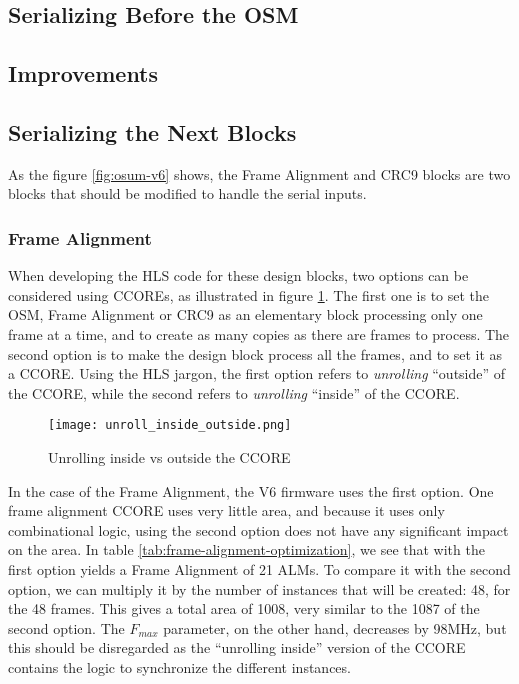 \subsection{Serializing Before the OSM}

\subsection{Improvements}


\subsection{Serializing the Next Blocks}
As the figure \ref{fig:osum-v6} shows, the Frame Alignment and CRC9 blocks are two blocks that should be modified to handle the serial inputs.

\subsubsection{Frame Alignment}

When developing the HLS code for these design blocks, two options can be considered using CCOREs, as illustrated in figure \ref{fig:unrolling-inside-outside}. The first one is to set the OSM, Frame Alignment or CRC9 as an elementary block processing only one frame at a time, and to create as many copies as there are frames to process. The second option is to make the design block process all the frames, and to set it as a CCORE. Using the HLS jargon, the first option refers to \textit{unrolling} ``outside'' of the CCORE, while the second refers to \textit{unrolling} ``inside'' of the CCORE.

\begin{figure}
    \centering
    \texttt{[image: unroll\_inside\_outside.png]}
    \caption{Unrolling inside vs outside the CCORE}
    \label{fig:unrolling-inside-outside}
\end{figure}

In the case of the Frame Alignment, the V6 firmware uses the first option. One frame alignment CCORE uses very little area, and because it uses only combinational logic, using the second option does not have any significant impact on the area. In table \ref{tab:frame-alignment-optimization}, we see that with the first option yields a Frame Alignment of 21 ALMs. To compare it with the second option, we can multiply it by the number of instances that will be created: 48, for the 48 frames. This gives a total area of 1008, very similar to the 1087 of the second option. The \(F_{max}\) parameter, on the other hand, decreases by 98MHz, but this should be disregarded as the ``unrolling inside'' version of the CCORE contains the logic to synchronize the different instances.

